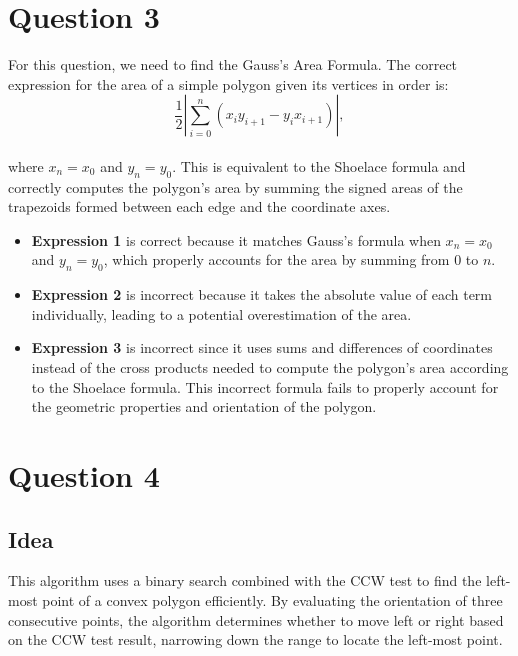 \documentclass{article}
\begin{document}
\section*{Question 3}
For this question, we need to find the Gauss's Area Formula. The correct expression for the area of a simple polygon given its vertices in order is:
\\
\[ \frac{1}{2} \left| \sum_{i=0}^{n} (x_i y_{i+1} - y_i x_{i+1}) \right|, \]
\\
where \( x_n = x_0 \) and \( y_n = y_0 \). This is equivalent to the Shoelace formula and correctly computes the polygon's area by summing the signed areas of the trapezoids formed between each edge and the coordinate axes.
\\
\begin{itemize}
  \item \textbf{Expression 1} is correct because it matches Gauss's formula when \( x_n = x_0 \) and \( y_n = y_0 \), which properly accounts for the area by summing from 0 to \( n \).
  \item \textbf{Expression 2} is incorrect because it takes the absolute value of each term individually, leading to a potential overestimation of the area.
  \item \textbf{Expression 3} is incorrect since it uses sums and differences of coordinates instead of the cross products needed to compute the polygon's area according to the Shoelace formula. 
  This incorrect formula fails to properly account for the geometric properties and orientation of the polygon.
\end{itemize}

\section*{Question 4}

\subsection*{Idea}
This algorithm uses a binary search combined with the CCW test to find the left-most point of a convex polygon efficiently. By evaluating the orientation of three consecutive points, the algorithm determines whether to move left or right based on the CCW test result, narrowing down the range to locate the left-most point.
\end{document}
